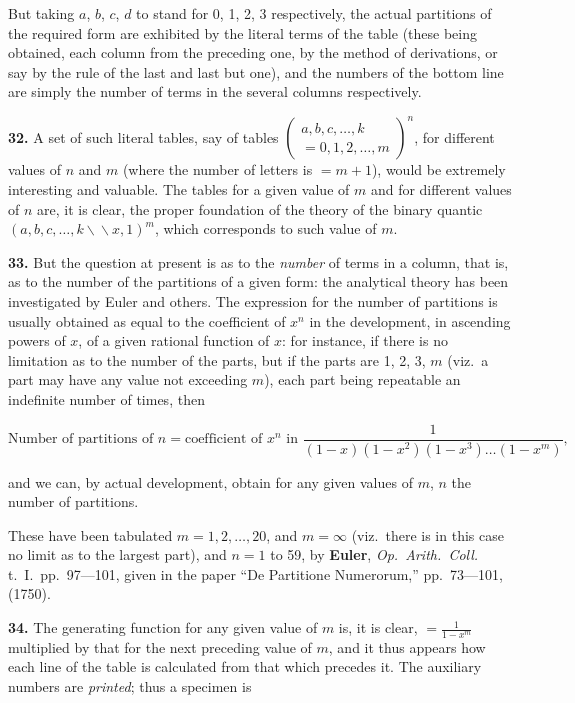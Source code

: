 \documentclass[11pt,a4paper]{article}
\begin{document}
But taking $a$, $b$, $c$, $d$ to stand for 0, 1, 2, 3 respectively, the actual partitions of
the required form are exhibited by the literal terms of the table (these being obtained,
each column from the preceding one, by the method of derivations, or say by the
rule of the last and last but one), and the numbers of the bottom line are simply
the number of terms in the several columns respectively.

\textbf{32.} A set of such literal tables, say of tables $\begin{pmatrix} a, b, c, \ldots, k \\ =0, 1, 2, \ldots, m \end{pmatrix}^{n}$,
for different values of $n$ and $m$ (where the number of letters is $= m+1$), would be extremely
interesting and valuable. The tables for a given value of $m$ and for different values
of $n$ are, it is clear, the proper foundation of the theory of the binary quantic
$(a, b, c, \ldots, k \backslash\!\!\backslash x, 1)^{m}$, which corresponds to such value of $m$.

\textbf{33.} But the question at present is as to the \textit{number} of terms in a column,
that is, as to the number of the partitions of a given form: the analytical theory
has been investigated by Euler and others. The expression for the number of
partitions is usually obtained as equal to the coefficient of $x^{n}$ in the development, in
ascending powers of $x$, of a given rational function of $x$: for instance, if there is no
limitation as to the number of the parts, but if the parts are 1, 2, 3, $m$ (viz.\ a
part may have any value not exceeding $m$), each part being repeatable an indefinite
number of times, then

\[\text{Number of partitions of } n = \text{coefficient of } x^{n} \text{ in } \frac{1}{(1-x)(1-x^{2})(1-x^{3})\ldots(1-x^{m})},\]

and we can, by actual development, obtain for any given values of $m$, $n$ the number
of partitions.

These have been tabulated $m = 1, 2, \ldots, 20$, and $m = \infty$ (viz.\ there is in this case
no limit as to the largest part), and $n = 1$ to 59, by
\quad\textbf{Euler}, \textit{Op.\ Arith.\ Coll.} t.\ I.\ pp.\ 97---101,
given in the paper ``De Partitione Numerorum,'' pp.\ 73---101, (1750).

\textbf{34.} The generating function for any given value of $m$ is, it is clear, $= \frac{1}{1-x^{m}}$
multiplied by that for the next preceding value of $m$, and it thus appears how each line
of the table is calculated from that which precedes it. The auxiliary numbers are
\textit{printed}; thus a specimen is
\end{document}
